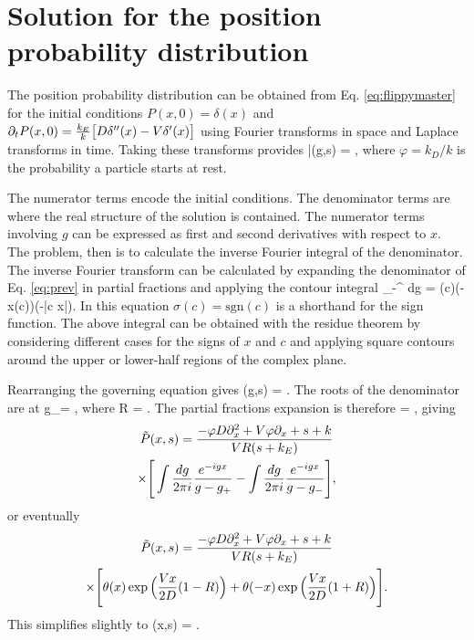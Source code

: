 \section{Solution for the position probability distribution}
\label{sec:fluccymastersol}
The position probability distribution can be obtained from Eq. \ref{eq:flippymaster} for the initial conditions $P(x,0) = \delta(x)$ and $ \partial_t P(x,0) = \frac{k_E}{k}\big[D\delta''(x)-V \delta'(x) \big]$ using Fourier transforms in space and Laplace transforms in time. Taking these transforms provides
\be \bar{}(g,s) = ,  \label{eq:prev}\ee
where $\varphi = k_D/k$ is the probability a particle starts at rest.

The numerator terms encode the initial conditions. The denominator terms are where the real structure of the solution is contained.
The numerator terms involving $g$ can be expressed as first and second derivatives with respect to $x$. The problem, then is to calculate the inverse Fourier integral of the denominator.
The inverse Fourier transform can be calculated by expanding the denominator of Eq. \ref{eq:prev} in partial fractions and applying the contour integral \citep[e.g.][]{Arfken1985}
\be \int_{-\infty}^\infty {}  dg = \sigma(c)\theta(-x\sigma(c))\exp\big(-|c x|\big). \label{eq:contour}\ee
In this equation $\sigma(c) = \text{sgn}(c)$ is a shorthand for the sign function. The above integral can be obtained with the residue theorem by considering different cases for the signs of $x$ and $c$ and applying square contours around the upper or lower-half regions of the complex plane.

Rearranging the governing equation gives
\be {}(g,s) = .\ee
The roots of the denominator are at
\be g_\pm = \Big[ 1  \pm R \Big],\ee
where
\be R = .\ee
The partial fractions expansion is therefore
\be {} = ,\ee
giving 
\begin{multline} \tilde{P}(x,s) = \frac{-\varphi D\partial_x^2 + V\varphi\partial_x + s + k}{VR(s+k_E)} \\ \times \Bigg[ \int \frac{dg}{2\pi i}\frac{e^{-igx}}{g-g_+} - \int \frac{dg}{2\pi i}\frac{e^{-igx}}{g-g_-}\Bigg],\end{multline}
or eventually
\begin{multline}
 \tilde{P}(x,s) = \frac{-\varphi D\partial_x^2 + V\varphi \partial_x + s + k}{VR(s+k_E)} \\ \times \Bigg[ \theta(x) \exp\Big(\frac{Vx}{2D}(1-R)\Big) + \theta(-x)\exp\Big( \frac{Vx}{2D}(1+R)\Big) \Bigg].\end{multline}
This simplifies slightly to
\be {}(x,s) = \exp{} \label{eq:laplaceapp}.
\ee

